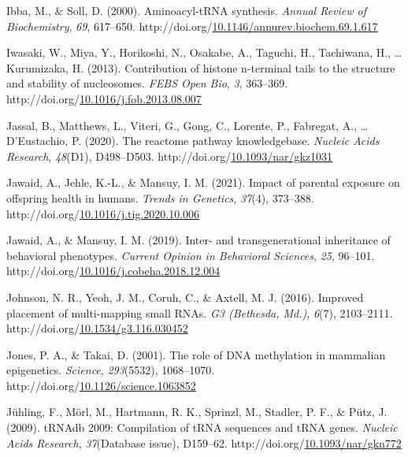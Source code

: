 \documentclass[12pt,twoside]{reedthesis}
\newlength{\cslhangindent}
\newenvironment{CSLReferences}[2] %
 {%
  \setlength{\parindent}{0pt}
  \ifodd #1 \everypar{\setlength{\hangindent}{\cslhangindent}}\ignorespaces\fi
  \ifnum #2 > 0
  \setlength{\parskip}{#2\baselineskip}
  \fi
 }%
 {}
\begin{document}
\begin{CSLReferences}{1}{0}
\leavevmode{}%
Ibba, M., \& Soll, D. (2000). Aminoacyl-tRNA synthesis. \emph{Annual Review of Biochemistry}, \emph{69}, 617--650. http://doi.org/\href{https://doi.org/10.1146/annurev.biochem.69.1.617}{10.1146/annurev.biochem.69.1.617}

\leavevmode{}%
Iwasaki, W., Miya, Y., Horikoshi, N., Osakabe, A., Taguchi, H., Tachiwana, H., \ldots{} Kurumizaka, H. (2013). Contribution of histone n-terminal tails to the structure and stability of nucleosomes. \emph{FEBS Open Bio}, \emph{3}, 363--369. http://doi.org/\href{https://doi.org/10.1016/j.fob.2013.08.007}{10.1016/j.fob.2013.08.007}

\leavevmode{}%
Jassal, B., Matthews, L., Viteri, G., Gong, C., Lorente, P., Fabregat, A., \ldots{} D'Eustachio, P. (2020). The reactome pathway knowledgebase. \emph{Nucleic Acids Research}, \emph{48}(D1), D498--D503. http://doi.org/\href{https://doi.org/10.1093/nar/gkz1031}{10.1093/nar/gkz1031}

\leavevmode{}%
Jawaid, A., Jehle, K.-L., \& Mansuy, I. M. (2021). Impact of parental exposure on offspring health in humans. \emph{Trends in Genetics}, \emph{37}(4), 373--388. http://doi.org/\href{https://doi.org/10.1016/j.tig.2020.10.006}{10.1016/j.tig.2020.10.006}

\leavevmode{}%
Jawaid, A., \& Mansuy, I. M. (2019). Inter- and transgenerational inheritance of behavioral phenotypes. \emph{Current Opinion in Behavioral Sciences}, \emph{25}, 96--101. http://doi.org/\href{https://doi.org/10.1016/j.cobeha.2018.12.004}{10.1016/j.cobeha.2018.12.004}

\leavevmode{}%
Johnson, N. R., Yeoh, J. M., Coruh, C., \& Axtell, M. J. (2016). Improved placement of multi-mapping small RNAs. \emph{G3 (Bethesda, Md.)}, \emph{6}(7), 2103--2111. http://doi.org/\href{https://doi.org/10.1534/g3.116.030452}{10.1534/g3.116.030452}

\leavevmode{}%
Jones, P. A., \& Takai, D. (2001). The role of DNA methylation in mammalian epigenetics. \emph{Science}, \emph{293}(5532), 1068--1070. http://doi.org/\href{https://doi.org/10.1126/science.1063852}{10.1126/science.1063852}

\leavevmode{}%
Jühling, F., Mörl, M., Hartmann, R. K., Sprinzl, M., Stadler, P. F., \& Pütz, J. (2009). tRNAdb 2009: Compilation of tRNA sequences and tRNA genes. \emph{Nucleic Acids Research}, \emph{37}(Database issue), D159--62. http://doi.org/\href{https://doi.org/10.1093/nar/gkn772}{10.1093/nar/gkn772}


\end{CSLReferences}
\end{document}
